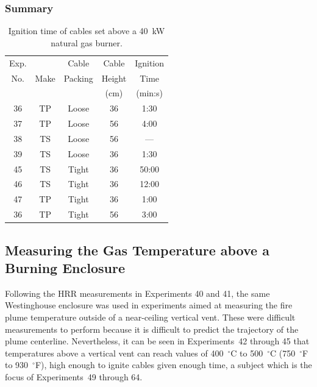 \documentclass[12pt]{article}
\begin{document}
\subsubsection{Summary}

\begin{table}[ht]
\begin{center}
\caption[Results of cable tray ignition experiments]{Ignition time of cables set above a 40~kW natural gas burner.}
\label{matrix}
\begin{tabular}{|c|c|c|c|c|}
\hline
Exp.   &          & Cable             & Cable         & Ignition         \\
No.    & Make     & Packing           & Height        & Time             \\
       &          &                   & (cm)          & (min:s)          \\ \hline
36     & TP       & Loose             & 36            & 1:30             \\ \hline
37     & TP       & Loose             & 56            & 4:00             \\ \hline
38     & TS       & Loose             & 56            & ---              \\ \hline
39     & TS       & Loose             & 36            & 1:30             \\ \hline
45     & TS       & Tight             & 36            & 50:00            \\ \hline
46     & TS       & Tight             & 36            & 12:00            \\ \hline
47     & TP       & Tight             & 36            & 1:00             \\ \hline
36     & TP       & Tight             & 56            & 3:00             \\ \hline

\end{tabular}
\end{center}
\end{table}



\clearpage

\subsection{Measuring the Gas Temperature above a Burning Enclosure}

Following the HRR measurements in Experiments 40 and 41, the same Westinghouse enclosure was used in experiments aimed at measuring the fire plume temperature outside of a near-ceiling vertical vent. These were difficult measurements to perform because it is difficult to predict the trajectory of the plume centerline. Nevertheless, it can be seen in Experiments~42 through 45 that temperatures above a vertical vent can reach values of 400~$^\circ$C to 500~$^\circ$C (750~$^\circ$F to 930~$^\circ$F), high enough to ignite cables given enough time, a subject which is the focus of Experiments~49 through 64.
\end{document}
